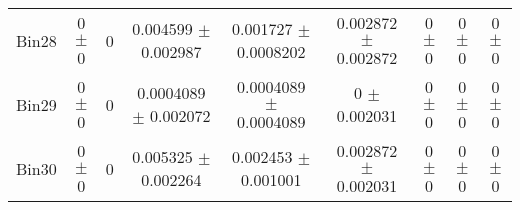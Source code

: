 \begin{tabular}{@{\extracolsep{4pt}}lcccccccc@{}}
     Bin28 & 0 $\pm$ 0 & 0 & 0.004599 $\pm$ 0.002987 & 0.001727 $\pm$ 0.0008202 & 0.002872 $\pm$ 0.002872 & 0 $\pm$ 0 & 0 $\pm$ 0 & 0 $\pm$ 0 \\ 
     Bin29 & 0 $\pm$ 0 & 0 & 0.0004089 $\pm$ 0.002072 & 0.0004089 $\pm$ 0.0004089 & 0 $\pm$ 0.002031 & 0 $\pm$ 0 & 0 $\pm$ 0 & 0 $\pm$ 0 \\ 
     Bin30 & 0 $\pm$ 0 & 0 & 0.005325 $\pm$ 0.002264 & 0.002453 $\pm$ 0.001001 & 0.002872 $\pm$ 0.002031 & 0 $\pm$ 0 & 0 $\pm$ 0 & 0 $\pm$ 0 \\ 
\hline\hline
  \end{tabular}
